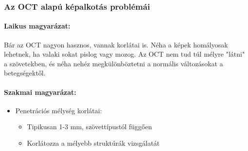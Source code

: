\documentclass[a4paper,12pt]{article}
\begin{document}
\subsubsection{Az OCT alapú képalkotás problémái}

\paragraph{Laikus magyarázat:} Bár az OCT nagyon hasznos, vannak korlátai is. Néha a képek homályosak lehetnek, ha valaki sokat pislog vagy mozog. Az OCT nem tud túl mélyre "látni" a szövetekben, és néha nehéz megkülönböztetni a normális változásokat a betegségektől.

\paragraph{Szakmai magyarázat:} \begin{itemize} \item Penetrációs mélység korlátai: \begin{itemize} \item Tipikusan 1-3 mm, szövettípustól függően \item Korlátozza a mélyebb struktúrák vizsgálatát \end{itemize}


\end{itemize}
\end{document}
